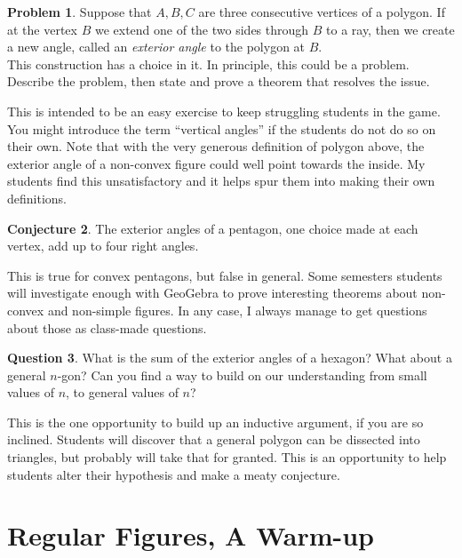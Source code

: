 \documentclass{tufte-handout}
\theoremstyle{definition}
\newtheorem{problem}{Problem}[section]
\newtheorem{conjecture}[problem]{Conjecture}
\newtheorem{question}[problem]{Question}
\begin{document}
\begin{problem}\label{prob:exterior-angle}
Suppose that $A,B,C$ are three consecutive vertices of a polygon. 
If at the vertex $B$ we extend one of the two sides through $B$ to a ray, then we create a new angle, called an \emph{exterior angle} to the polygon at $B$.\\
This construction has a choice in it. 
In principle, this could be a problem. 
Describe the problem, then state and prove a theorem that resolves the issue.
\end{problem}

This is intended to be an easy exercise to keep struggling students in the game. You might introduce the term ``vertical angles'' if the students do not do so on their own. Note that with the very generous definition of polygon above, the exterior angle of a non-convex figure could well point towards the inside. My students 
find this unsatisfactory and it helps spur them into making their own definitions.


\begin{conjecture}\label{conj:ext-angles-pentagon}
The exterior angles of a pentagon, one choice made at each vertex, add up to four right angles.
\end{conjecture}

This is true for convex pentagons, but false in general. Some semesters students will investigate enough with GeoGebra to 
prove interesting theorems about non-convex and non-simple figures. In any case, I always manage to get questions about those as class-made questions.

\begin{question}\label{question-induction}
What is the sum of the exterior angles of a hexagon? 
What about a general $n$-gon? 
Can you find a way to build on our understanding from small values of $n$, to general values of $n$?
\end{question}

This is the one opportunity to build up an inductive argument, if you are so inclined. Students will discover that a general polygon can be dissected into triangles, but probably will take that for granted. This is an opportunity to help students alter their hypothesis and make a meaty conjecture. 

\clearpage
\setcounter{section}{6}
\setcounter{problem}{0}
\section{Regular Figures, A Warm-up}
\end{document}
